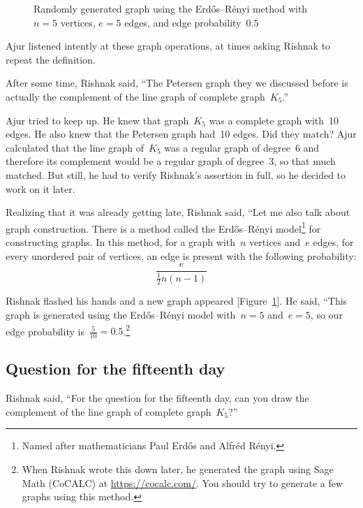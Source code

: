 \begin{figure}
\begin{center}
\caption{Randomly generated graph using the Erd\H{o}s--R\'enyi method with~$n=5$ vertices, $e=5$ edges, and edge probability~$0.5$}\label{17g9}
\end{center}
\end{figure}

Ajur listened intently at these graph operations, at times asking Rishnak to repeat the definition.

After some time, Rishnak said, ``The Petersen graph they we discussed before is actually the complement of the line graph of complete graph~$K_5$.''

Ajur tried to keep up. He knew that graph~$K_5$ was a complete graph with~10 edges. He also knew that the Petersen graph had~10 edges. Did they match? Ajur calculated that the line graph of~$K_5$ was a regular graph of degree~6 and therefore its complement would be a regular graph of degree~3, so that much matched. But still, he had to verify Rishnak's assertion in full, so he decided to work on it later.

Realizing that it was already getting late, Rishnak said, ``Let me also talk about graph construction. There is a method called the Erd\H{o}s--R\'enyi model\footnote{Named after mathematicians Paul Erd\H{o}s and Alfr\'ed R\'enyi.} for constructing graphs. In this method, for a graph with~$n$ vertices and~$e$ edges, for every unordered pair of vertices, an edge is present with the following probability:
$$\frac{e}{\frac{1}{2}n(n-1)}$$

Rishnak flashed his hands and a new graph appeared [Figure~\ref{17g9}]. He said, ``This graph is generated using the Erd\H{o}s--R\'enyi model with~$n=5$ and~$e=5$, so our edge probability is~$\frac{5}{10}=0.5$.\footnote{When Rishnak wrote this down later, he generated the graph using Sage Math (CoCALC) at \url{https://cocalc.com/}. You should try to generate a few graphs using this method.}

\subsection*{Question for the fifteenth day}
Rishnak said, ``For the question for the fifteenth day, can you draw the complement of the line graph of complete graph~$K_5$?''

